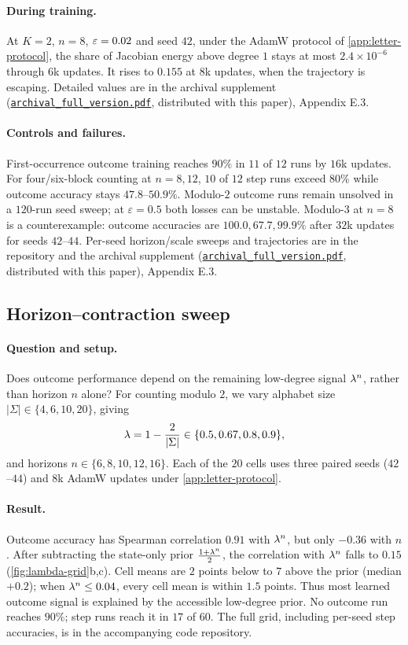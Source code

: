 \paragraph{During training.} At $K=2$, $n=8$, $\varepsilon=0.02$ and seed $42$, under the AdamW protocol of \cref{app:letter-protocol},
the share of Jacobian energy above degree $1$ stays at most $2.4\times10^{-6}$ through $6$k updates.
It rises to $0.155$ at $8$k updates, when the trajectory is escaping. Detailed values are in the archival supplement (\href{archival_full_version.pdf}{\texttt{archival\_full\_version.pdf}}, distributed with this paper), Appendix E.3.



\paragraph{Controls and failures.}
First-occurrence outcome training reaches $90\%$ in $11$ of $12$ runs by $16$k updates.
For four/six-block counting at $n=8,12$, $10$ of $12$ step runs exceed $80\%$ while
outcome accuracy stays $47.8$--$50.9\%$. Modulo-$2$ outcome runs remain unsolved
in a $120$-run seed sweep; at $\varepsilon=0.5$ both losses can be unstable.
Modulo-$3$ at $n=8$ is a counterexample: outcome accuracies are
$100.0,67.7,99.9\%$ after $32$k updates for seeds $42$--$44$.
Per-seed horizon/scale sweeps and trajectories are in the repository and
the archival supplement (\href{archival_full_version.pdf}{\texttt{archival\_full\_version.pdf}}, distributed with this paper), Appendix E.3.

\subsection{Horizon--contraction sweep}
\label{app:exp-lambda}
\paragraph{Question and setup.} Does outcome performance depend on the remaining low-degree signal $\lambda^n$, rather than horizon $n$ alone?
For counting modulo $2$, we vary alphabet size $|\Sigma|\in\{4,6,10,20\}$, giving
\[
 \lambda=1-\frac{2}{|\Sigma|}\in\{0.5,0.67,0.8,0.9\},
\]
and horizons $n\in\{6,8,10,12,16\}$. Each of the $20$ cells uses three paired seeds ($42$--$44$) and $8$k AdamW updates
under \cref{app:letter-protocol}.

\paragraph{Result.} Outcome accuracy has Spearman correlation $0.91$ with $\lambda^n$, but only $-0.36$ with $n$.
After subtracting the state-only prior $\frac{1+\lambda^n}{2}$, the correlation with $\lambda^n$ falls to $0.15$ (\cref{fig:lambda-grid}b,c).
Cell means are $2$ points below to $7$ above the prior (median $+0.2$); when $\lambda^n\le0.04$, every cell mean is within $1.5$ points.
Thus most learned outcome signal is explained by the accessible low-degree prior. No outcome run reaches $90\%$;
step runs reach it in $17$ of $60$. The full grid, including per-seed step accuracies, is in the accompanying code repository.

